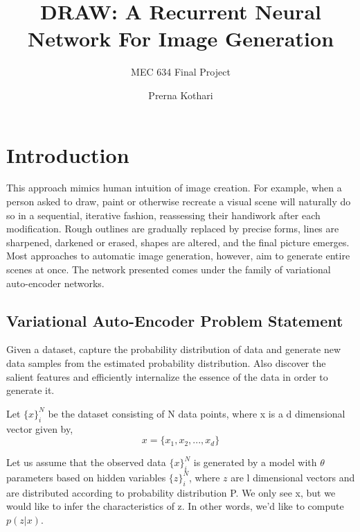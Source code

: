 \documentclass{scrartcl}
\title{DRAW: A Recurrent Neural Network For Image Generation}
\subtitle{MEC 634 Final Project}
\author{Prerna Kothari}
\begin{document}
\maketitle
{}

\section{Introduction}
This approach mimics human intuition of image creation.
For example, when a person asked to draw, paint or otherwise recreate a visual scene will naturally do so in a sequential, iterative fashion, reassessing their handiwork after each modification.
Rough outlines are gradually replaced by precise forms, lines are sharpened, darkened or erased, shapes are altered, and the final picture emerges.
Most approaches to automatic image generation, however, aim to generate entire scenes at once.
The network presented comes under the family of variational auto-encoder networks.

\subsection{Variational Auto-Encoder Problem Statement}
Given a dataset, capture the probability distribution of data and generate new data samples from the estimated probability distribution.
Also discover the salient features and efficiently internalize the essence of the data in order to generate it.

Let $\{x\}_i^N$ be the dataset consisting of N data points, where x is a d dimensional vector given by,
\begin{equation}
  x = \{ x_1, x_2, ... , x_d \}
\end{equation}

Let us assume that the observed data $\{x\}_i^N$ is generated by a model with $\theta$ parameters based on hidden variables $\{z\}_i^N$, where $z$ are l dimensional vectors and are distributed according to probability distribution P.
We only see x, but we would like to infer the characteristics of z. In other words, we’d like to compute $p(z|x)$.
\end{document}
